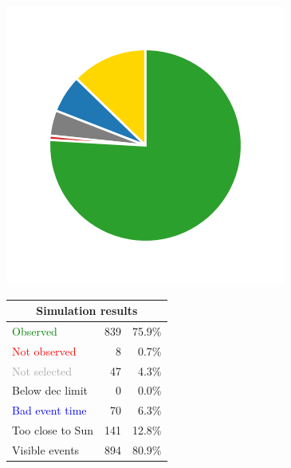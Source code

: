 \begin{colsection}
\begin{colsection}
\begin{figure}[p]
\begin{center}
\begin{minipage}[t]{0.2\textwidth}\vspace{10pt}
\includegraphics[width=\linewidth]{images/gw_sims/2n8+2s8_pie.png}
\end{minipage}
%
\begin{minipage}[t]{0.37\textwidth}\vspace{0pt}
\begin{tabular}{lrr}
\multicolumn{3}{c}{\textbf{Simulation results}} \\
\midrule
\textcolor{Green}{Observed} & 839 & 75.9\% \\
\textcolor{Red}{Not observed} & 8 & 0.7\% \\
\textcolor{darkgray}{Not selected} & 47 & 4.3\% \\
\textcolor{NavyBlue}{Below dec limit} & 0 & 0.0\% \\
\textcolor{Blue}{Bad event time} & 70 & 6.3\% \\
\textcolor{BurntOrange}{Too close to Sun} & 141 & 12.8\% \\
\midrule
Visible events & 894 &  80.9\% \\
\end{tabular}
\end{minipage}
%
\begin{minipage}[t]{0.35\textwidth}\vspace{0pt}

\end{minipage}
\end{center}
\end{figure}
\end{colsection}
\end{colsection}
